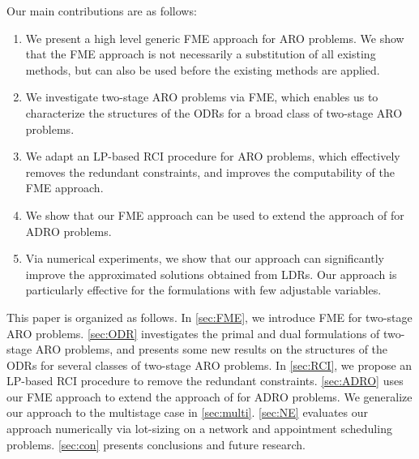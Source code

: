 \documentclass[fleqn,isre,blindrev]{informs4}
\begin{document}
	Our main contributions are as follows:
	\begin{enumerate}
		\item  We present a high level generic FME approach for ARO problems.  {We show that the FME approach is not necessarily a substitution of all existing methods, but can also be used before the existing methods are applied.}
		\item  We investigate two-stage ARO problems via FME, which enables us to characterize the structures of the ODRs for a broad class of two-stage ARO problems. 
		\item  We adapt an LP-based RCI procedure for ARO problems, which effectively removes the redundant constraints, and improves the computability of the FME approach.
		\item  We show that our FME approach can be used to extend the approach of \cite{bsz17} for ADRO problems. 
		\item Via numerical experiments, we show that our approach can significantly improve the  {approximated solutions obtained from LDRs}. Our approach is particularly effective for the formulations with few adjustable variables.
	\end{enumerate}
	
	This paper is organized as follows. In \textsection \ref{sec:FME}, we introduce FME for two-stage ARO problems. \textsection \ref{sec:ODR} investigates the primal and dual formulations of two-stage ARO problems, and presents some new results on the structures of the ODRs for several classes of two-stage ARO problems. In \textsection \ref{sec:RCI}, we propose an LP-based RCI procedure to remove the redundant constraints.  \textsection \ref{sec:ADRO} uses our FME approach to extend the approach of \cite{bsz17} for ADRO problems. We generalize our approach to the multistage case in \textsection \ref{sec:multi}. \textsection \ref{sec:NE} evaluates our approach numerically via lot-sizing on a network and appointment scheduling problems. \textsection \ref{sec:con} presents conclusions and future research.
	
\end{document}
